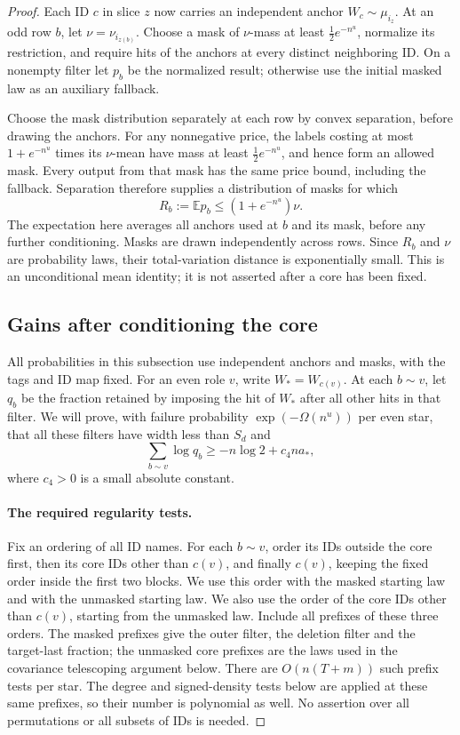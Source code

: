 \begin{proof}
Each ID \(c\) in slice \(z\) now carries an independent anchor \(W_c\sim\mu_{i_z}\). At an odd row \(b\), let \(\nu=\nu_{i_{z(b)}}\). Choose a mask of \(\nu\)-mass at least \(\tfrac12e^{-n^u}\), normalize its restriction, and require hits of the anchors at every distinct neighboring ID. On a nonempty filter let \(p_b\) be the normalized result; otherwise use the initial masked law as an auxiliary fallback.

Choose the mask distribution separately at each row by convex separation, before drawing the anchors. For any nonnegative price, the labels costing at most \(1+e^{-n^u}\) times its \(\nu\)-mean have mass at least \(\tfrac12e^{-n^u}\), and hence form an allowed mask. Every output from that mask has the same price bound, including the fallback. Separation therefore supplies a distribution of masks for which
\[
 R_b:=\mathbb E p_b\le(1+e^{-n^u})\nu.
\]
The expectation here averages all anchors used at \(b\) and its mask, before any further conditioning. Masks are drawn independently across rows. Since \(R_b\) and \(\nu\) are probability laws, their total-variation distance is exponentially small. This is an unconditional mean identity; it is not asserted after a core has been fixed.

\subsection{Gains after conditioning the core}
\label{sec:gains-after-conditioning-the-core}

All probabilities in this subsection use independent anchors and masks, with the tags and ID map fixed. For an even role \(v\), write \(W_*=W_{c(v)}\). At each \(b\sim v\), let \(q_b\) be the fraction retained by imposing the hit of \(W_*\) after all other hits in that filter. We will prove, with failure probability \(\exp(-\Omega(n^u))\) per even star, that all these filters have width less than \(S_d\) and
\begin{equation}
 \sum_{b\sim v}\log q_b\ge-n\log2+c_4na_* ,
 \label{eq:source-3}
\end{equation}
where \(c_4>0\) is a small absolute constant.

\paragraph{The required regularity tests.}
Fix an ordering of all ID names. For each \(b\sim v\), order its IDs outside the core first, then its core IDs other than \(c(v)\), and finally \(c(v)\), keeping the fixed order inside the first two blocks. We use this order with the masked starting law and with the unmasked starting law. We also use the order of the core IDs other than \(c(v)\), starting from the unmasked law. Include all prefixes of these three orders. The masked prefixes give the outer filter, the deletion filter and the target-last fraction; the unmasked core prefixes are the laws used in the covariance telescoping argument below. There are \(O(n(T+m))\) such prefix tests per star. The degree and signed-density tests below are applied at these same prefixes, so their number is polynomial as well. No assertion over all permutations or all subsets of IDs is needed.


\end{proof}
